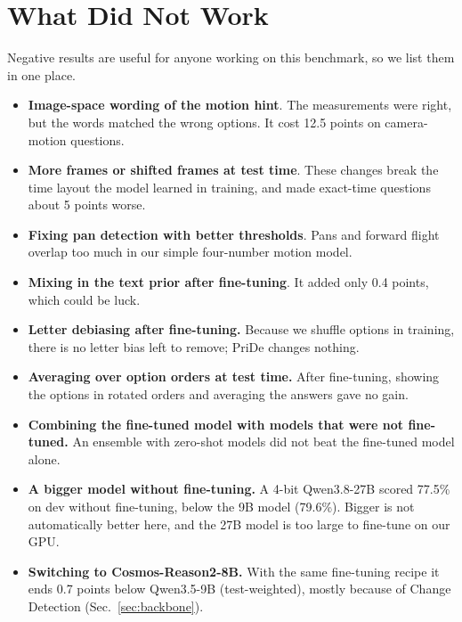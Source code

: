 \section{What Did Not Work}
\label{sec:negative}
Negative results are useful for anyone working on this benchmark, so we
list them in one place.

\begin{itemize}
\item \textbf{Image-space wording of the motion hint}. The
measurements were right, but the words matched the wrong options. It cost
12.5 points on camera-motion questions.
\item \textbf{More frames or shifted frames at test time}. These
changes break the time layout the model learned in training, and made
exact-time questions about 5 points worse.
\item \textbf{Fixing pan detection with better thresholds}.
Pans and forward flight overlap too much in our simple four-number motion
model.
\item \textbf{Mixing in the text prior after fine-tuning}. It added
only 0.4 points, which could be luck.
\item \textbf{Letter debiasing after fine-tuning.} Because we shuffle
options in training, there is no letter bias left to remove; PriDe changes
nothing.
\item \textbf{Averaging over option orders at test time.} After
fine-tuning, showing the options in rotated orders and averaging the
answers gave no gain.
\item \textbf{Combining the fine-tuned model with models that were not fine-tuned.} An
ensemble with zero-shot models did not beat the fine-tuned model alone.
\item \textbf{A bigger model without fine-tuning.} A 4-bit Qwen3.8-27B scored
77.5\% on dev without fine-tuning, below the 9B model (79.6\%). Bigger is not
automatically better here, and the 27B model is too large to fine-tune on
our GPU.
\item \textbf{Switching to Cosmos-Reason2-8B.} With the same fine-tuning
recipe it ends 0.7 points below Qwen3.5-9B (test-weighted), mostly because
of Change Detection (Sec.~\ref{sec:backbone}).
\end{itemize}
